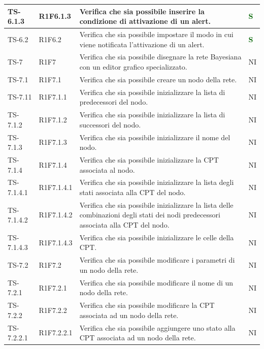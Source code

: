 \begin{longtable}{|C{2.5cm}|C{2.5cm}|C{6.5cm}|C{1.5cm}|}
			\hline
			{TS-6.1.3} & {R1F6.1.3} & Verifica che sia possibile inserire la
			condizione di attivazione di un alert.  & \textcolor{darkgreen}{\textbf{S}}\\
			\hline
			{TS-6.2} & {R1F6.2} & Verifica che sia possibile impostare il
			modo in cui viene notificata
			l'attivazione di un alert.  & \textcolor{darkgreen}{\textbf{S}}\\
			\hline
			{TS-7} & {R1F7} & Verifica che sia possibile disegnare la rete
			Bayesiana con un editor
			grafico specializzato.  & {NI}\\
			\hline
			{TS-7.1} & {R1F7.1} & Verifica che sia possibile creare un nodo
			della rete.  & {NI}\\
			\hline
			{TS-7.11} & {R1F7.1.1} & Verifica che sia  possibile inizializzare la lista di predecessori
			del nodo.  & {NI}\\
			\hline
			{TS-7.1.2} & {R1F7.1.2} & Verifica che sia possibile inizializzare la lista di successori del
			nodo.  & {NI}\\
			\hline
			{TS-7.1.3} & {R1F7.1.3} & Verifica che sia possibile inizializzare il nome del nodo.  & {NI}\\
			\hline
			{TS-7.1.4} & {R1F7.1.4} & Verifica che sia possibile inizializzare la CPT associata al
			nodo.  & {NI}\\
			\hline
			{TS-7.1.4.1} & {R1F7.1.4.1} & Verifica che sia possibile inizializzare la lista degli stati
			associata alla CPT del nodo.  & {NI}\\
			\hline
			{TS-7.1.4.2} & {R1F7.1.4.2} & Verifica che sia possibile inizializzare la lista delle
			combinazioni degli stati dei nodi
			predecessori associata alla CPT del
			nodo.  & {NI}\\
			\hline
			{TS-7.1.4.3} & {R1F7.1.4.3} & Verifica che sia possibile inizializzare le celle della CPT.  & {NI}\\
			\hline
			{TS-7.2} & {R1F7.2} & Verifica che sia possibile modificare i
			parametri di un nodo della rete.  & {NI}\\
			\hline
			{TS-7.2.1} & {R1F7.2.1} & Verifica che sia  possibile modificare il
			nome di un nodo della rete.  & {NI}\\
			\hline
			{TS-7.2.2} & {R1F7.2.2} & Verifica che sia possibile modificare la
			CPT associata ad un nodo della rete.  & {NI}\\
			\hline
			{TS-7.2.2.1} & {R1F7.2.2.1} & Verifica che sia possibile aggiungere uno
			stato alla CPT associata ad un nodo
			della rete.
  & {NI}\\

\end{longtable}
